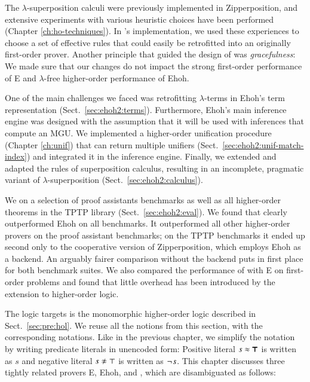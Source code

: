 %
The $\lambda$-superposition calculi were
previously implemented in Zipperposition, and
extensive experiments with various heuristic choices have been performed
(Chapter \ref{ch:ho-techniques}). In \ehohii{}'s implementation, we used
these experiences to choose a set of effective rules that could easily be
retrofitted into an originally first-order prover. Another principle that guided 
the design of \ehohii{} was \emph{gracefulness}: We made sure that our changes
do not impact the strong first-order performance of E and $\lambda$-free higher-order performance of Ehoh. 


One of the main challenges we faced was retrofitting $\lambda$-terms in Ehoh's
term representation (Sect.~\ref{sec:ehoh2:terms}). Furthermore, Ehoh's main inference
engine was designed with the assumption that it will be used with
inferences that compute an MGU. We
implemented a higher-order unification procedure (Chapter \ref{ch:unif})
that can return multiple unifiers (Sect.~\ref{sec:ehoh2:unif-match-index}) and
integrated it in the inference engine. Finally, we extended and adapted the
rules of superposition calculus, resulting in an incomplete, pragmatic variant of
$\lambda$-superposition (Sect.~\ref{sec:ehoh2:calculus}).

We  \ehohii{} on a selection of proof assistants benchmarks
as well as all higher-order theorems in the TPTP library \cite{gs-17-tptp}
(Sect.~\ref{sec:ehoh2:eval}). We found
that \ehohii{} clearly outperformed Ehoh on all benchmarks. It outperformed all other higher-order provers on the
proof assistant benchmarks; on the TPTP benchmarks it ended up second only 
to the cooperative version of Zipperposition, which employs Ehoh as a
backend. An arguably fairer comparison without the backend puts \ehohii{} in
first place for both benchmark suites.
We also compared the performance of \ehohii{} with E on first-order
problems and found that little overhead has been introduced by the
extension to higher-order logic.

 The logic \ehohii{} targets is the monomorphic higher-order
logic described in Sect.~\ref{sec:pre:hol}. We reuse all the notions from this
section, with the corresponding notations. Like in the previous chapter, we
simplify the notation by writing predicate literals in unencoded form: Positive
literal $s \approx \pmb{\top}$ is written as $s$ and negative literal
$\neqlit{s}{\top}$ is written as $\neg{\kern.2ex s}$.   This chapter discusses
three tightly related provers E, Ehoh, and \ehohii{}, which are disambiguated as
follows:

